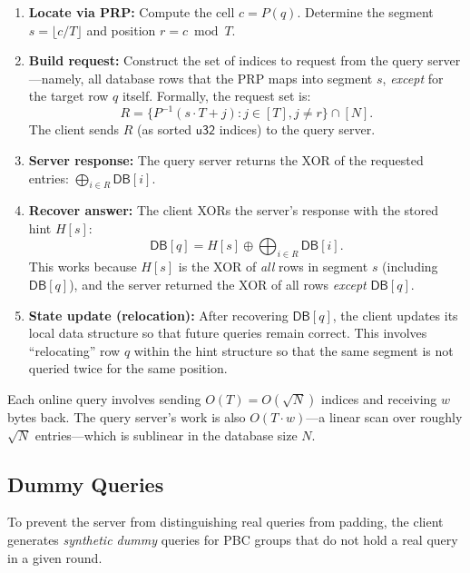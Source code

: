 \begin{enumerate}[nolistsep,leftmargin=*]
    \item \textbf{Locate via PRP:} Compute the cell $c = P(q)$. Determine the segment $s = \lfloor c/T \rfloor$ and position $r = c \bmod T$.

    \item \textbf{Build request:} Construct the set of indices to request from the query server---namely, all database rows that the PRP maps into segment $s$, \emph{except} for the target row $q$ itself. Formally, the request set is:
    $$R = \{P^{-1}(s \cdot T + j) : j \in [T], j \neq r\} \cap [N].$$
    The client sends $R$ (as sorted $\mathsf{u32}$ indices) to the query server.

    \item \textbf{Server response:} The query server returns the XOR of the requested entries: $\bigoplus_{i \in R} \mathsf{DB}[i]$.

    \item \textbf{Recover answer:} The client XORs the server's response with the stored hint $H[s]$:
    $$\mathsf{DB}[q] = H[s] \oplus \bigoplus_{i \in R} \mathsf{DB}[i].$$
    This works because $H[s]$ is the XOR of \emph{all} rows in segment $s$ (including $\mathsf{DB}[q]$), and the server returned the XOR of all rows \emph{except} $\mathsf{DB}[q]$.

    \item \textbf{State update (relocation):} After recovering $\mathsf{DB}[q]$, the client updates its local data structure so that future queries remain correct. This involves ``relocating'' row $q$ within the hint structure so that the same segment is not queried twice for the same position.
\end{enumerate}

Each online query involves sending $O(T) = O(\sqrt{N})$ indices and receiving $w$ bytes back. The query server's work is also $O(T \cdot w)$---a linear scan over roughly $\sqrt{N}$ entries---which is sublinear in the database size $N$.

\subsection{Dummy Queries}
\label{sec:harmony-dummies}

To prevent the server from distinguishing real queries from padding, the client generates \emph{synthetic dummy} queries for PBC groups that do not hold a real query in a given round.

